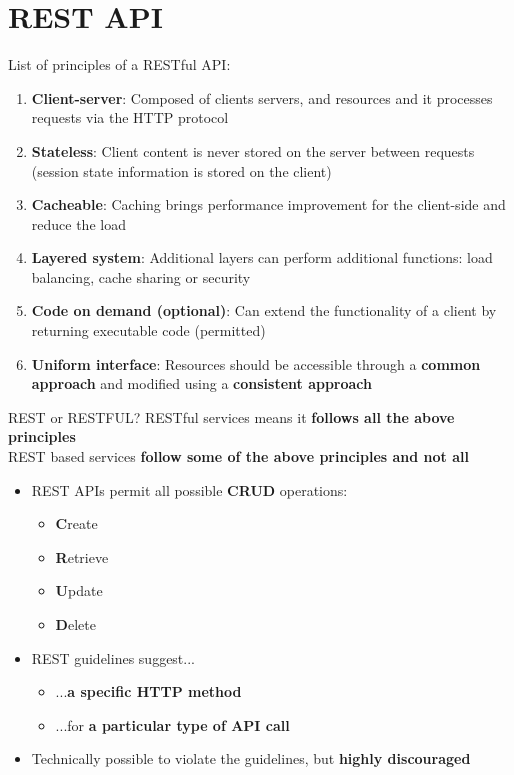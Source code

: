 \documentclass{beamer}[10pt, usepdftitle=false handout]
\begin{document}
\section{REST API}

\begin{frame}

List of principles of a RESTful API:
\vspace*{0.6em}

\begin{enumerate}
\item{\textbf{Client-server}: Composed of clients servers, and resources and it processes requests via the HTTP protocol}
\item{\textbf{Stateless}: Client content is never stored on the server between requests (session state information is stored on the client)}
\item{\textbf{Cacheable}: Caching brings performance improvement for the client-side and reduce the load}
\item{\textbf{Layered system}: Additional layers can perform additional functions: load balancing, cache sharing or security}
\item{\textbf{Code on demand (optional)}: Can extend the functionality of a client by returning executable code (permitted)}
\item{\textbf{Uniform interface}: Resources should be accessible through a \textbf{common approach} and modified using a \textbf{consistent approach}}
\end{enumerate}

\begin{block}{REST or RESTFUL?}
RESTful services means it \textbf{follows all the above principles} \\
REST based services \textbf{follow some of the above principles and not all}
\end{block}

\end{frame}

\begin{frame}

\begin{itemize}
\item{REST APIs permit all possible \textbf{CRUD} operations:
	\begin{itemize}
		\item{\textbf{C}reate}
		\item{\textbf{R}etrieve}
		\item{\textbf{U}pdate}
		\item{\textbf{D}elete}
	\end{itemize} }
\item{REST guidelines suggest...
	\begin{itemize}
		\item{...\textbf{a specific HTTP method}}
		\item{...for \textbf{a particular type of API call}}
	\end{itemize} 
	}
	\item{Technically possible to violate the guidelines, but \textbf{highly discouraged}}
\end{itemize}

\end{frame}
\end{document}
